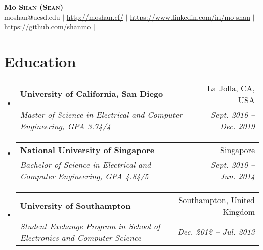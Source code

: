 \documentclass[letterpaper,11pt]{article}
\makeatletter
\newcommand{\resumeItem}[1]{
  \item\small{
    {#1 \vspace{-2pt}}
  }
}
\newcommand{\resumeSubheading}[4]{
  \vspace{-2pt}\item
    \begin{tabular*}{0.97\textwidth}[t]{l@{\extracolsep{\fill}}r}
      \textbf{#1} & #2 \\
      \textit{\small#3} & \textit{\small #4} \\
    \end{tabular*}\vspace{-7pt}
}
\newcommand{\resumeSubItem}[1]{\resumeItem{#1}\vspace{-4pt}}
\newcommand{\resumeSubHeadingListStart}{\begin{itemize}[leftmargin=0.15in, label={}]}
\newcommand{\resumeSubHeadingListEnd}{\end{itemize}}
\newcommand{\resumeItemListStart}{\begin{itemize}}
\makeatother
\begin{document}

\begin{center}
    \textbf{\Huge \scshape Mo Shan (Sean)} \\ \vspace{1pt}
    \small moshan@ucsd.edu $|$
    \href{https://moshan.cf}{\underline{http://moshan.cf/}} $|$ 
    \href{https://www.linkedin.com/in/mo-shan-21393452/}{\underline{https://www.linkedin.com/in/mo-shan}} $|$
    \href{https://github.com/shanmo}{\underline{https://github.com/shanmo}} $|$ 
\end{center}


\section{Education}
  \resumeSubHeadingListStart
    \resumeSubheading
      {University of California, San Diego}{La Jolla, CA, USA}
      {Master of Science in Electrical and Computer Engineering, \textit{GPA 3.74/4}}
      {Sept. 2016 -- Dec. 2019}
    \resumeSubheading
      {National University of Singapore}{Singapore}
      {Bachelor of Science in Electrical and Computer Engineering, \textit{GPA 4.84/5}}
      {Sept. 2010 -- Jun. 2014}
    \resumeSubheading
      {University of Southampton}{Southampton, United Kingdom}
      {Student Exchange Program in School of Electronics and Computer Science}
      {Dec. 2012 -- Jul. 2013}
  \resumeSubHeadingListEnd


      
\end{document}
